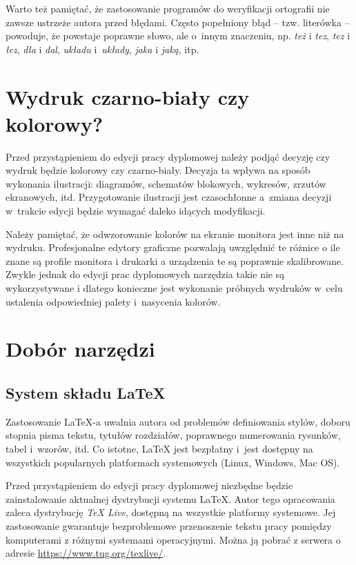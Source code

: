 Warto też pamiętać, że zastosowanie programów do weryfikacji ortografii nie zawsze ustrzeże autora przed błędami. Często popełniony błąd -- tzw. literówka -- powoduje, że powstaje poprawne słowo, ale o~innym znaczeniu, np. \textit{też} i \textit{tez},  \textit{tez} i \textit{łez}, \emph{dla} i \emph{dal}, \textit{układu} i~\textit{układy}, \textit{jaka} i \textit{jaką}, itp.


\section{Wydruk czarno-biały czy kolorowy?}
Przed przystąpieniem do edycji pracy dyplomowej należy podjąć decyzję czy wydruk będzie kolorowy czy czarno-biały. Decyzja ta wpływa na sposób wykonania ilustracji: diagramów, schematów blokowych, wykresów, zrzutów ekranowych, itd. Przygotowanie ilustracji jest czasochłonne a~zmiana decyzji w~trakcie edycji będzie wymagać daleko idących modyfikacji.

Należy pamiętać, że odwzorowanie kolorów na ekranie monitora jest inne niż  na wydruku. Profesjonalne edytory graficzne pozwalają uwzględnić te różnice o ile znane są profile monitora i drukarki a urządzenia te są poprawnie skalibrowane. Zwykle jednak do edycji prac dyplomowych narzędzia takie nie są wykorzystywane i dlatego konieczne jest wykonanie próbnych wydruków w~celu ustalenia odpowiedniej palety i~nasycenia kolorów.

\section{Dobór narzędzi}
\label{sec:tools}
\subsection{System składu {\LaTeX}}
Zastosowanie  {\LaTeX}-a uwalnia  autora od problemów definiowania stylów, doboru stopnia pisma tekstu, tytułów rozdziałów, poprawnego numerowania rysunków, tabel i~wzorów, itd. Co istotne, {\LaTeX}  jest bezpłatny i~jest dostępny na wszystkich popularnych platformach systemowych (Linux, Windows, Mac OS). 

Przed przystąpieniem do edycji pracy dyplomowej niezbędne będzie zainstalowanie aktualnej dystrybucji systemu  {\LaTeX}. Autor tego opracowania zaleca dystrybucję \textit{TeX Live}, dostępną na wszystkie platformy systemowe. Jej zastosowanie gwarantuje bezproblemowe przenoszenie tekstu pracy pomiędzy komputerami z różnymi systemami operacyjnymi. Można ją pobrać z serwera o adresie \url{https://www.tug.org/texlive/}.

